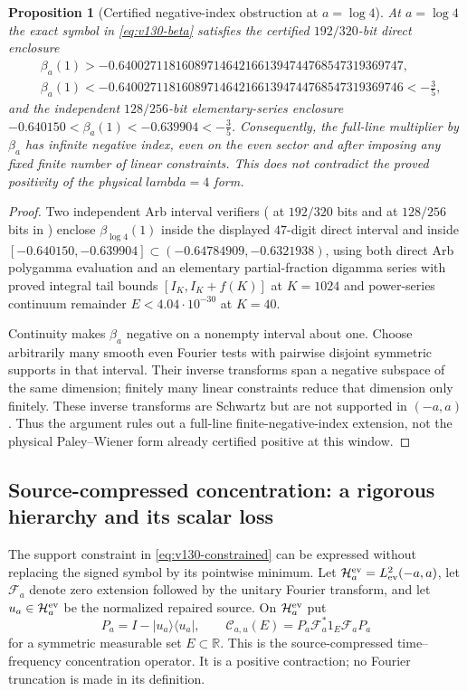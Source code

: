 \documentclass[11pt]{article}
\def\lambda{lambda}%
\newtheorem{proposition}[theorem]{Proposition}
\theoremstyle{remark}
\begin{document}
\begin{proposition}[Certified negative-index obstruction at $a=\log 4$]
\label{prop:v132-global-index}
At $a=\log4$ the exact symbol in \eqref{eq:v130-beta} satisfies the certified $192/320$-bit direct enclosure
\begin{align*}
 &\beta_a(1) > -0.640027118160897146421661394744768547319369747, \\
 &\beta_a(1) < -0.640027118160897146421661394744768547319369746 < -\frac35,
\end{align*}
and the independent $128/256$-bit elementary-series enclosure $-0.640150<\beta_a(1)<-0.639904<-\frac35$.
Consequently, the full-line multiplier by $\beta_a$ has infinite
negative index, even on the even sector and after imposing any fixed
finite number of linear constraints. This does not contradict the
proved positivity of the physical $\lambda=4$ form.
\end{proposition}
\begin{proof}
Two independent Arb interval verifiers ( at $192/320$ bits and  at $128/256$ bits in ) enclose $\beta_{\log 4}(1)$ inside the displayed $47$-digit direct interval and inside $[-0.640150,-0.639904]\subset (-0.64784909,-0.6321938)$, using both direct Arb polygamma evaluation and an elementary partial-fraction digamma series with proved integral tail bounds $[I_K,I_K+f(K)]$ at $K=1024$ and power-series continuum remainder $E<4.04\cdot 10^{-30}$ at $K=40$.

Continuity makes $\beta_a$ negative on a nonempty interval about one.
Choose arbitrarily many smooth even Fourier tests with pairwise
disjoint symmetric supports in that interval. Their inverse transforms
span a negative subspace of the same dimension; finitely many linear
constraints reduce that dimension only finitely. These inverse
transforms are Schwartz but are not supported in $(-a,a)$. Thus the
argument rules out a full-line finite-negative-index extension, not the
physical Paley--Wiener form already certified positive at this window.
\end{proof}

\subsection{Source-compressed concentration: a rigorous hierarchy and its scalar loss}

The support constraint in \eqref{eq:v130-constrained} can be expressed
without replacing the signed symbol by its pointwise minimum.  Let
$\mathcal H_a^{\rm ev}=L^2_{\rm ev}(-a,a)$, let $\mathcal F_a$ denote
zero extension followed by the unitary Fourier transform, and let
$u_a\in\mathcal H_a^{\rm ev}$ be the normalized repaired source.  On
$\mathcal H_a^{\rm ev}$ put
\[
 P_a=I-|u_a\rangle\langle u_a|,
 \qquad
 \mathcal C_{a,u}(E)
 =P_a\mathcal F_a^*1_E\mathcal F_aP_a
\]
for a symmetric measurable set $E\subset\mathbb R$.  This is the
source-compressed time--frequency concentration operator.  It is a
positive contraction; no Fourier truncation is made in its definition.
\end{document}
